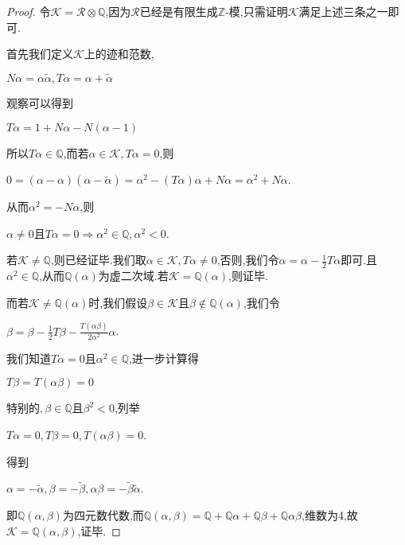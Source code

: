 \documentclass[11pt]{ctexart}
\begin{document}
\begin{proof}令$\mathcal{K}=\mathcal{R}\otimes \mathbb{Q}$,因为$\mathcal{R}$已经是有限生成$\mathbb{Z}$-模,只需证明$\mathcal{K}$满足上述三条之一即可.

首先我们定义$\mathcal{K}$上的迹和范数,
\begin{center}
    $N\alpha =\alpha \widetilde{\alpha}$$,T\alpha=\alpha+\widetilde{\alpha}$
\end{center}
\noindent 观察可以得到
\begin{center}
    $T\alpha=1+N\alpha-N(\alpha-1)$
\end{center}
\noindent 所以$T\alpha \in \mathbb{Q}$,而若$\alpha \in \mathcal{K}$$,T\alpha=0$,则
\begin{center}
    $0=(\alpha-\alpha)(\alpha-\widetilde{\alpha})=\alpha^2-(T\alpha)\alpha+N\alpha=\alpha^2+N\alpha$.
\end{center}
\noindent 从而$\alpha^2=-N\alpha$,则
\begin{center}
    $\alpha \neq 0$且$T\alpha=0 \Longrightarrow \alpha^2 \in \mathbb{Q}$$,\alpha^2<0$.
\end{center}
若$\mathcal{K}\neq \mathbb{Q}$,则已经证毕.我们取$\alpha \in \mathcal{K}$$,T\alpha\neq 0$,否则,我们令$\alpha =\alpha-\frac{1}{2}T\alpha$即可.且$\alpha^2 \in \mathbb{Q}$,从而$\mathbb{Q}(\alpha)$为虚二次域.若$\mathcal{K}=\mathbb{Q}(\alpha)$,则证毕.

而若$\mathcal{K}\neq \mathbb{Q}(\alpha)$时,我们假设$\beta \in \mathcal{K} $且$\beta \notin  \mathbb{Q}(\alpha) $,我们令
\begin{center}
    $\beta = \beta -\frac{1}{2}T\beta-\frac{T(\alpha\beta)}{2\alpha^2}\alpha$.   
\end{center}
\noindent 我们知道$T\alpha=0$且$\alpha^2 \in \mathbb{Q}$,进一步计算得
\begin{center}
    $T\beta =T(\alpha\beta)=0$
\end{center}
\noindent 特别的$,\beta \in \mathbb{Q}$且$\beta^2<0$,列举
\begin{center}
    $T\alpha=0$$,T\beta=0$$,T(\alpha\beta)=0$.
\end{center}
\noindent 得到
\begin{center}
    $\alpha=-\widetilde{\alpha}$$,\beta=-\widetilde{\beta}$$,\alpha\beta=-\widetilde{\beta}\widetilde{\alpha}$.
\end{center}
\noindent 即$\mathbb{Q}(\alpha,\beta)$为四元数代数,而$\mathbb{Q}(\alpha,\beta)=\mathbb{Q}+\mathbb{Q}\alpha+\mathbb{Q}\beta+\mathbb{Q}\alpha\beta$,维数为4,故$\mathcal{K}=\mathbb{Q}(\alpha,\beta)$,证毕.
\end{proof}
\end{document}
